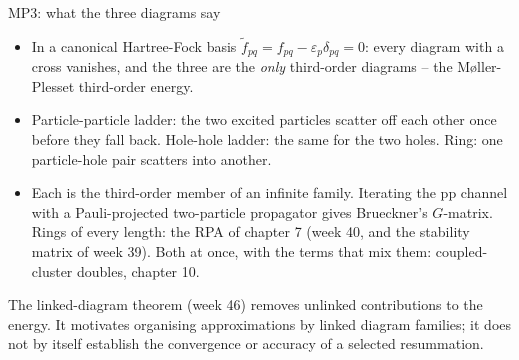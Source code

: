 \documentclass[aspectratio=169,10pt]{beamer}
\newcommand{\mbbox}[1]{%
  \begin{tcolorbox}[colback=paleblue,colframe=uioblue,title={\bfseries Many-body connection}]
  #1
  \end{tcolorbox}}
\newcommand{\ftil}[1]{\tilde f_{#1}}
\begin{document}
\begin{frame}{MP3: what the three diagrams say}
\begin{itemize}
\item In a canonical Hartree-Fock basis \(\ftil{pq}=f_{pq}-\varepsilon_p\delta_{pq}=0\): every diagram with a cross vanishes, and the three are the \emph{only} third-order diagrams -- the M\o{}ller-Plesset third-order energy.
\item Particle-particle ladder: the two excited particles scatter off each other once before they fall back. Hole-hole ladder: the same for the two holes. Ring: one particle-hole pair scatters into another.
\item Each is the third-order member of an infinite family. Iterating the pp channel with a Pauli-projected two-particle propagator gives Brueckner's \(G\)-matrix. Rings of every length: the RPA of chapter 7 (week 40, and the stability matrix of week 39). Both at once, with the terms that mix them: coupled-cluster doubles, chapter 10.
\end{itemize}
\mbbox{The linked-diagram theorem (week 46) removes unlinked contributions to the energy. It motivates organising approximations by linked diagram families; it does not by itself establish the convergence or accuracy of a selected resummation.}
\end{frame}
\end{document}
